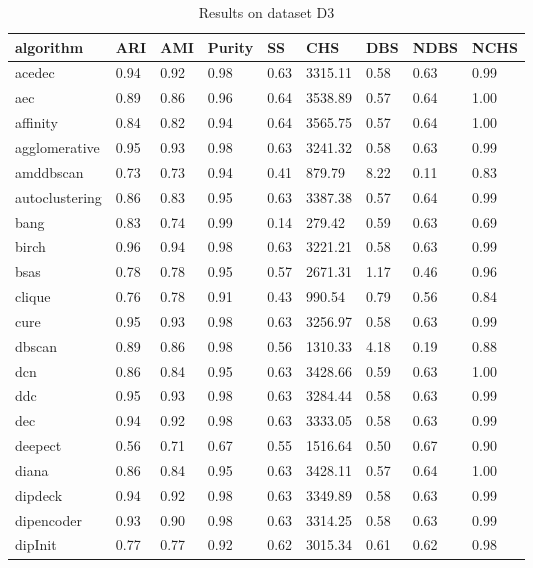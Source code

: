 \begin{table}[H]
\centering
\caption{Results on dataset D3}
\label{S56_Table}
\begin{tabular}{|l|l|l|l|l|l|l|l|l|}
\hline
algorithm & ARI & AMI & Purity & SS & CHS & DBS & NDBS & NCHS \\
\hline
acedec & 0.94 & 0.92 & 0.98 & 0.63 & 3315.11 & 0.58 & 0.63 & 0.99 \\
\hline
aec & 0.89 & 0.86 & 0.96 & 0.64 & 3538.89 & 0.57 & 0.64 & 1.00 \\
\hline
affinity & 0.84 & 0.82 & 0.94 & 0.64 & 3565.75 & 0.57 & 0.64 & 1.00 \\
\hline
agglomerative & 0.95 & 0.93 & 0.98 & 0.63 & 3241.32 & 0.58 & 0.63 & 0.99 \\
\hline
amddbscan & 0.73 & 0.73 & 0.94 & 0.41 & 879.79 & 8.22 & 0.11 & 0.83 \\
\hline
autoclustering & 0.86 & 0.83 & 0.95 & 0.63 & 3387.38 & 0.57 & 0.64 & 0.99 \\
\hline
bang & 0.83 & 0.74 & 0.99 & 0.14 & 279.42 & 0.59 & 0.63 & 0.69 \\
\hline
birch & 0.96 & 0.94 & 0.98 & 0.63 & 3221.21 & 0.58 & 0.63 & 0.99 \\
\hline
bsas & 0.78 & 0.78 & 0.95 & 0.57 & 2671.31 & 1.17 & 0.46 & 0.96 \\
\hline
clique & 0.76 & 0.78 & 0.91 & 0.43 & 990.54 & 0.79 & 0.56 & 0.84 \\
\hline
cure & 0.95 & 0.93 & 0.98 & 0.63 & 3256.97 & 0.58 & 0.63 & 0.99 \\
\hline
dbscan & 0.89 & 0.86 & 0.98 & 0.56 & 1310.33 & 4.18 & 0.19 & 0.88 \\
\hline
dcn & 0.86 & 0.84 & 0.95 & 0.63 & 3428.66 & 0.59 & 0.63 & 1.00 \\
\hline
ddc & 0.95 & 0.93 & 0.98 & 0.63 & 3284.44 & 0.58 & 0.63 & 0.99 \\
\hline
dec & 0.94 & 0.92 & 0.98 & 0.63 & 3333.05 & 0.58 & 0.63 & 0.99 \\
\hline
deepect & 0.56 & 0.71 & 0.67 & 0.55 & 1516.64 & 0.50 & 0.67 & 0.90 \\
\hline
diana & 0.86 & 0.84 & 0.95 & 0.63 & 3428.11 & 0.57 & 0.64 & 1.00 \\
\hline
dipdeck & 0.94 & 0.92 & 0.98 & 0.63 & 3349.89 & 0.58 & 0.63 & 0.99 \\
\hline
dipencoder & 0.93 & 0.90 & 0.98 & 0.63 & 3314.25 & 0.58 & 0.63 & 0.99 \\
\hline
dipInit & 0.77 & 0.77 & 0.92 & 0.62 & 3015.34 & 0.61 & 0.62 & 0.98 \\

\end{tabular}
\end{table}
